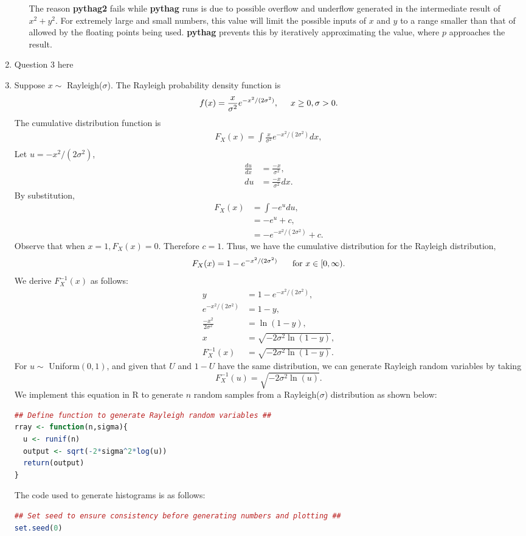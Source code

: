 \documentclass{amsart}
\theoremstyle{definition}
\theoremstyle{remark}
\begin{document}
\begin{enumerate}
\begin{enumerate}
The reason \textbf{pythag2} fails while \textbf{pythag} runs is due to possible overflow and underflow generated in the intermediate result of $x^2+y^2$. For extremely large and small numbers, this value will limit the possible inputs of $x$ and $y$ to a range smaller than that of allowed by the floating points being used. \textbf{pythag} prevents this by iteratively approximating the value, where $p$ approaches the result. 
\\
\end{enumerate}
\item
Question 3 here
\item
Suppose $x \sim$ Rayleigh($\sigma$). The Rayleigh probability density function is
$$ f(x) = \frac{x}{\sigma^2}e^{-x^2/(2\sigma^2)}, \hspace{0.5cm} x \geq 0, \sigma >0.$$
The cumulative distribution function is
\begin{align*}
F_X(x) = \int \frac{x}{\sigma^2}e^{-x^2/(2\sigma^2)} dx,\\
\end{align*}
Let $u = -x^2/(2\sigma^2)$,
\begin{align*}
\frac{du}{dx} &= \frac{-x}{\sigma^2},\\
du &= \frac{-x}{\sigma^2}dx.
\end{align*}
By substitution,
\begin{align*}
F_X(x) &= \int -e^u du,\\
&= -e^u + c,\\
&= -e^{-x^2/(2\sigma^2)} + c.
\end{align*}
Observe that when $x=1, F_X(x)=0$. Therefore $c=1$. Thus, we have the cumulative distribution for the Rayleigh distribution,
$$ F_X(x) = 1 - e^{-x^2/(2\sigma^2)} \hspace{0.5cm} \text{ for } x \in [0,\infty).$$
We derive $F^{-1}_X(x)$ as follows:
\begin{align*}
y &= 1 - e^{-x^2/(2\sigma^2)},\\
e^{-x^2/(2\sigma^2)} &= 1-y,\\
\frac{-x^2}{2\sigma^2} &= \ln (1-y),\\
x &= \sqrt{-2\sigma^2 \ln (1-y)},\\
F^{-1}_X(x) &= \sqrt{-2\sigma^2 \ln (1-y)}.
\end{align*}
For $u \sim$ Uniform$(0,1)$, and given that $U$ and $1-U$ have the same distribution, we can generate Rayleigh random variables by taking
$$ F^{-1}_X(u) = \sqrt{-2\sigma^2 \ln (u)}.$$
We implement this equation in R to generate $n$ random samples from a Rayleigh($\sigma$) distribution as shown below:
\begin{lstlisting}[language=R]
## Define function to generate Rayleigh random variables ##
rray <- function(n,sigma){
  u <- runif(n)
  output <- sqrt(-2*sigma^2*log(u))
  return(output)
}
\end{lstlisting}
The code used to generate histograms is as follows:
\begin{lstlisting}[language=R]
## Set seed to ensure consistency before generating numbers and plotting ##
set.seed(0)


\end{lstlisting}
\end{enumerate}
\end{document}
